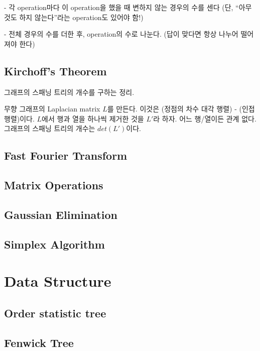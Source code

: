 \documentclass[10pt,landscape,a4paper,twocolumn]{article}
\begin{document}
- 각 operation마다 이 operation을 했을 때 변하지 않는 경우의 수를 센다
(단, ``아무것도 하지 않는다''라는 operation도 있어야 함!)

- 전체 경우의 수를 더한 후, operation의 수로 나눈다. (답이 맞다면 항상 나누어 떨어져야 한다)

\subsection{Kirchoff's Theorem}

그래프의 스패닝 트리의 개수를 구하는 정리.

무향 그래프의 Laplacian matrix $L$를 만든다. 이것은 (정점의 차수 대각 행렬) - (인접행렬)이다.
$L$에서 행과 열을 하나씩 제거한 것을 $L'$라 하자. 어느 행/열이든 관계 없다.
그래프의 스패닝 트리의 개수는 $det(L')$이다.

\subsection{Fast Fourier Transform}


\subsection{Matrix Operations}


\subsection{Gaussian Elimination}


\subsection{Simplex Algorithm}



\section{Data Structure}

\subsection{Order statistic tree}


\subsection{Fenwick Tree}

\end{document}
